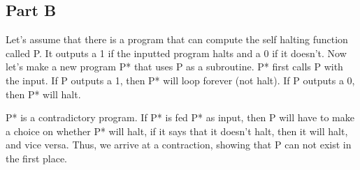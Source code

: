\documentclass[12pt]{article}
\begin{document}
\subsection*{Part B}

Let's assume that there is a program that can compute the self halting function called P. It outputs a 1 if the inputted program halts and a 0 if it doesn't. Now let's make a new program P* that uses P as a subroutine. P* first calls P with the input. If P outputs a 1, then P* will loop forever (not halt). If P outputs a 0, then P* will halt. 

P* is a contradictory program. If P* is fed P* as input, then P will have to make a choice on whether P* will halt, if it says that it doesn't halt, then it will halt, and vice versa. Thus, we arrive at a contraction, showing that P can not exist in the first place. 
\end{document}
